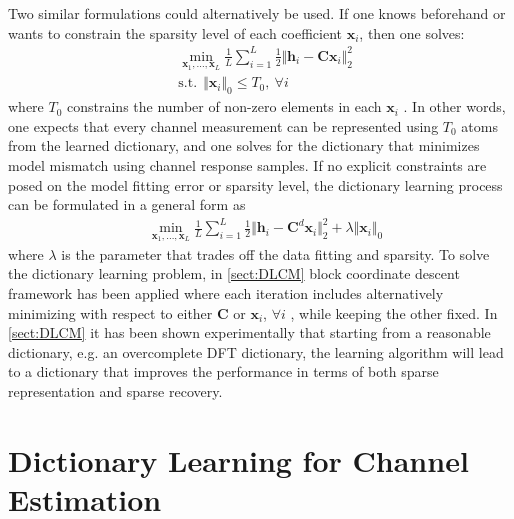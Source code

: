 Two similar formulations could alternatively be used. If one knows beforehand or wants to
constrain the sparsity level of each coefficient $\mathbf{x}_i$, then one solves:
\begin{align}
&\min\limits_{\mathbf{x}_1,\ldots,\mathbf{x}_L} \frac{1}{L}\sum_{i=1}^L\frac{1}{2}\Vert\mathbf{h}_i-\mathbf{C}\mathbf{x}_i\Vert_2^2\\
&\mathrm{s.t.}\:\:\Vert\mathbf{x}_i\Vert_0\leq T_0,\:\forall i
\label{eq:DL_vector_form_2}
\end{align}
where $T_0$ constrains the number of non-zero elements in each $\mathbf{x}_i$
. In other words, one expects that 
every channel measurement can be represented using $T_0$ atoms from the learned dictionary, and
one solves for the dictionary that minimizes model mismatch using channel response samples. If no explicit constraints are posed on the model fitting error or sparsity level, the dictionary learning process can be formulated in a general form as
\begin{align}
&\min\limits_{\mathbf{x}_1,\ldots,\mathbf{x}_L} \frac{1}{L}\sum_{i=1}^L\frac{1}{2}\Vert\mathbf{h}_i-\mathbf{C}^d\mathbf{x}_i\Vert_2^2+\lambda\Vert\mathbf{x}_i\Vert_0
\label{eq:DL_vector_form_3}
\end{align}
where $\lambda$ is the parameter that trades off the data fitting and sparsity.
To solve the dictionary learning problem, in \ref{sect:DLCM} block coordinate descent framework
has been applied where each iteration includes alternatively minimizing with respect to
either $\mathbf{C}$ or $\mathbf{x}_i$, $\forall i$
, while keeping the other fixed. In \ref{sect:DLCM} it has been shown experimentally that starting from a reasonable
dictionary, e.g. an overcomplete DFT dictionary, the learning algorithm will lead to a dictionary
that improves the performance in terms of both sparse representation and sparse recovery.

\section{Dictionary Learning for Channel Estimation}

